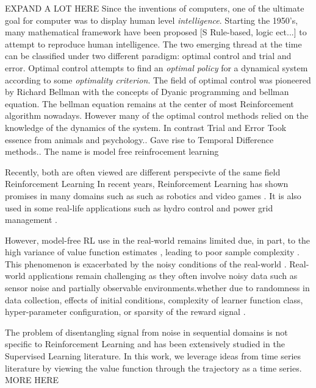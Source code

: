 EXPAND A LOT HERE
Since the inventions of computers, one of the ultimate goal for computer was to  display human level \emph{intelligence}. Starting the 1950's, many mathematical framework have been proposed [S Rule-based, logic ect...] to attempt to reproduce human intelligence. The two emerging thread at the time can be classified under two different paradigm: optimal control and trial and error. Optimal control attempts to find an \emph{optimal policy} for a dynamical system according to some \emph{optimality criterion}.  The field of optimal control was pioneered by Richard Bellman with the concepts of Dyanic programming and bellman equation. The bellman equation remains at the center of most Reinforcement algorithm nowadays. However many of the optimal control methods relied on the knowledge of the dynamics of the system. In contrast Trial and Error Took essence from animals and psychology..
Gave rise to Temporal Difference methods.. The name is model free reinfrocement learning 

Recently, both are often viewed are different perspecivte of the same field Reinforcement Learning
In recent years, Reinforcement Learning has shown promises in many domains such as  such as robotics \cite{kober2013reinforcement,abbeel2010autonomous} and video games \cite{vinyals2017starcraft,mnih2013playing,mnih2016asynchronous}. It is also used in some real-life applications such as hydro control \cite{grinberg2014optimizing} and power grid management \cite{franccois2016deep}.


 However, model-free RL use in the real-world remains limited due, in part, to the high variance of value function estimates \cite{greensmith2004variance}, leading to poor sample complexity \cite{glascher2010states,kakade2003sample}. This phenomenon is exacerbated by the noisy conditions of the real-world \cite{fox2015taming,pendrith1994reinforcement}. Real-world applications remain challenging as they often involve noisy data such as sensor noise and partially observable environments.whether due to randomness in data collection, effects of initial conditions, complexity of learner function class, hyper-parameter configuration, or sparsity of the reward signal \cite{henderson2017deep}.
 
The problem of disentangling signal from noise in sequential domains is not specific to Reinforcement Learning and has been extensively studied in the Supervised Learning literature. In this work, we leverage ideas from time series literature by viewing the value function through the trajectory as a time series. MORE HERE 

